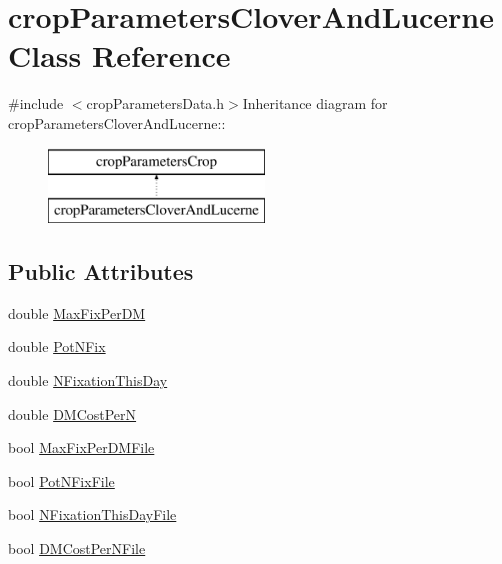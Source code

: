 \hypertarget{classcrop_parameters_clover_and_lucerne}{
\section{cropParametersCloverAndLucerne Class Reference}
\label{classcrop_parameters_clover_and_lucerne}
}


{\ttfamily \#include $<$cropParametersData.h$>$}Inheritance diagram for cropParametersCloverAndLucerne::\begin{figure}[H]
\begin{center}
\leavevmode
\includegraphics[height=2cm]{classcrop_parameters_clover_and_lucerne}
\end{center}
\end{figure}
\subsection*{Public Attributes}
\begin{DoxyCompactItemize}
\item 
double \hyperlink{classcrop_parameters_clover_and_lucerne_ac9b0d4522d96df75432927362a7e1bd9}{MaxFixPerDM}
\item 
double \hyperlink{classcrop_parameters_clover_and_lucerne_a19ea02e1393a6f02186d9cf9e3fff744}{PotNFix}
\item 
double \hyperlink{classcrop_parameters_clover_and_lucerne_a12a88064f616d057f54a987c723c3fe8}{NFixationThisDay}
\item 
double \hyperlink{classcrop_parameters_clover_and_lucerne_a773a03ccc9dd5d91252c10d77919daf8}{DMCostPerN}
\item 
bool \hyperlink{classcrop_parameters_clover_and_lucerne_a39a5d4684180915dd9e63fd19680dc74}{MaxFixPerDMFile}
\item 
bool \hyperlink{classcrop_parameters_clover_and_lucerne_ac95d345f85a1754a3225d1ab9b7a0145}{PotNFixFile}
\item 
bool \hyperlink{classcrop_parameters_clover_and_lucerne_a8902dd60269eca0ecd9d7821b5252b5a}{NFixationThisDayFile}
\item 
bool \hyperlink{classcrop_parameters_clover_and_lucerne_a2f07df5186a02c4549c039622e3485aa}{DMCostPerNFile}
\end{DoxyCompactItemize}


